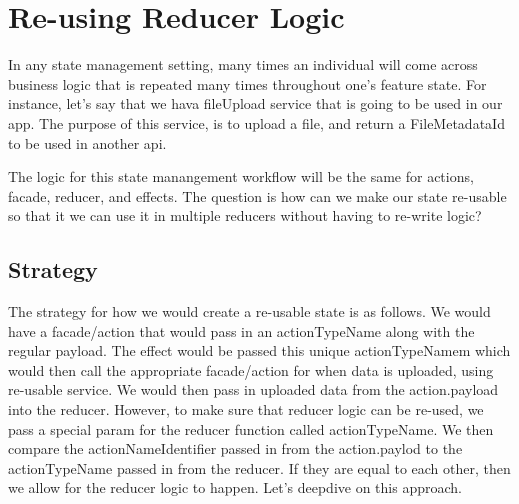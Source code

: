 \maketitle{}
\section{ Re-using Reducer Logic }

In any state management setting, many times an individual will come across
business logic that is repeated many times throughout one's feature state. For
instance, let's say that we hava fileUpload service that is going to be used in
our app. The purpose of this service, is to upload a file, and return a
FileMetadataId to be used in another api.

The logic for this state manangement workflow will be the same for actions,
facade, reducer, and effects. The question is how can we make our state
re-usable so that it we can use it in multiple reducers without having to
re-write logic?

\subsection{ Strategy }

The strategy for how we would create a re-usable state is as follows. We would
have a facade/action that would pass in an actionTypeName along with the
regular payload. The effect would be passed this unique actionTypeNamem which
would then call the appropriate facade/action for when data is uploaded, using
re-usable service. We would then pass in uploaded data from the action.payload
into the reducer. However, to make sure that reducer logic can be re-used, we
pass a special param for the reducer function called actionTypeName. We then
compare the actionNameIdentifier passed in from the action.paylod to the
actionTypeName passed in from the reducer. If they are equal to each other, then
we allow for the reducer logic to happen. Let's deepdive on this approach.

